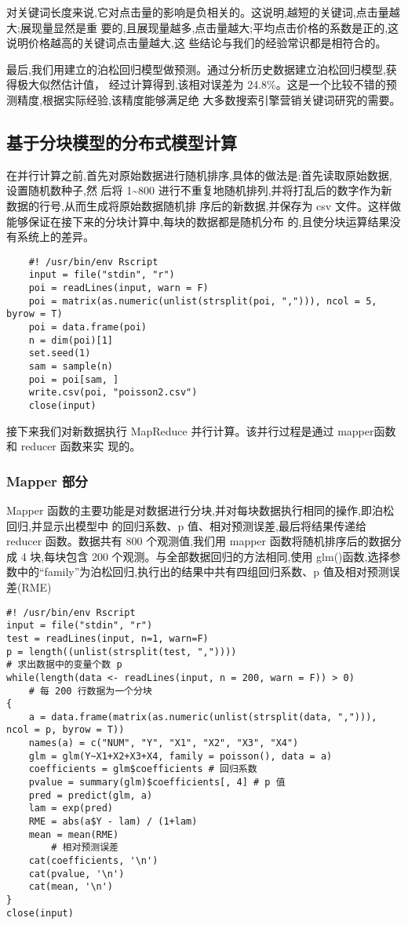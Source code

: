 对关键词长度来说,它对点击量的影响是负相关的。这说明,越短的关键词,点击量越大;展现量显然是重
要的,且展现量越多,点击量越大;平均点击价格的系数是正的,这说明价格越高的关键词点击量越大,这
些结论与我们的经验常识都是相符合的。

最后,我们用建立的泊松回归模型做预测。通过分析历史数据建立泊松回归模型,获得极大似然估计值，
经过计算得到,该相对误差为
24.8\%。这是一个比较不错的预测精度,根据实际经验,该精度能够满足绝
大多数搜索引擎营销关键词研究的需要。

\subsection{基于分块模型的分布式模型计算}\label{ux57faux4e8eux5206ux5757ux6a21ux578bux7684ux5206ux5e03ux5f0fux6a21ux578bux8ba1ux7b97}

在并行计算之前,首先对原始数据进行随机排序,具体的做法是:首先读取原始数据,设置随机数种子,然
后将 1\textasciitilde{}800
进行不重复地随机排列,并将打乱后的数字作为新数据的行号,从而生成将原始数据随机排
序后的新数据,并保存为 csv
文件。这样做能够保证在接下来的分块计算中,每块的数据都是随机分布
的,且使分块运算结果没有系统上的差异。

\begin{lstlisting}
	#! /usr/bin/env Rscript
	input = file("stdin", "r")
	poi = readLines(input, warn = F)
	poi = matrix(as.numeric(unlist(strsplit(poi, ","))), ncol = 5, byrow = T)
	poi = data.frame(poi)
	n = dim(poi)[1]
	set.seed(1)
	sam = sample(n)
	poi = poi[sam, ]
	write.csv(poi, "poisson2.csv")
	close(input)
\end{lstlisting}

接下来我们对新数据执行 MapReduce 并行计算。该并行过程是通过 mapper函数和
reducer 函数来实 现的。

\subsubsection{Mapper 部分}\label{mapper-ux90e8ux5206}

Mapper
函数的主要功能是对数据进行分块,并对每块数据执行相同的操作,即泊松回归,并显示出模型中
的回归系数、p 值、相对预测误差,最后将结果传递给 reducer 函数。数据共有
800 个观测值,我们用 mapper 函数将随机排序后的数据分成 4 块,每块包含 200
个观测。与全部数据回归的方法相同,使用
glm()函数,选择参数中的``family''为泊松回归,执行出的结果中共有四组回归系数、p
值及相对预测误 差(RME)

\begin{lstlisting}
#! /usr/bin/env Rscript
input = file("stdin", "r")
test = readLines(input, n=1, warn=F)
p = length((unlist(strsplit(test, ","))))
# 求出数据中的变量个数 p
while(length(data <- readLines(input, n = 200, warn = F)) > 0)
    # 每 200 行数据为一个分块
{
    a = data.frame(matrix(as.numeric(unlist(strsplit(data, ","))), ncol = p, byrow = T))
    names(a) = c("NUM", "Y", "X1", "X2", "X3", "X4")
    glm = glm(Y~X1+X2+X3+X4, family = poisson(), data = a)
    coefficients = glm$coefficients # 回归系数
    pvalue = summary(glm)$coefficients[, 4] # p 值
    pred = predict(glm, a)
    lam = exp(pred)
    RME = abs(a$Y - lam) / (1+lam)
    mean = mean(RME)
        # 相对预测误差
    cat(coefficients, '\n')
    cat(pvalue, '\n')
    cat(mean, '\n')
}
close(input)
\end{lstlisting}

